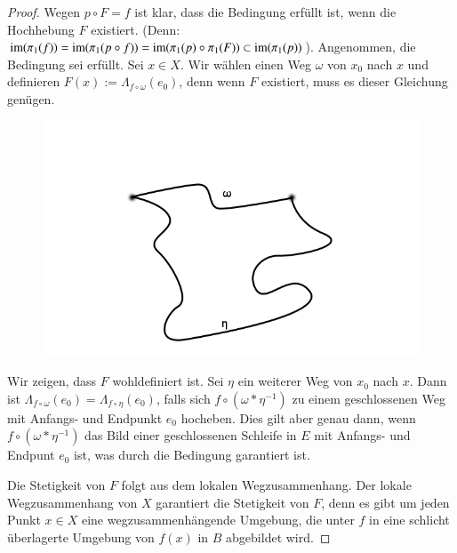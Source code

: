 \documentclass[a4paper,10pt]{scrartcl}
\begin{document}
\begin{proof}
 Wegen $p\circ F=f$ ist klar, dass die Bedingung erfüllt ist, wenn die Hochhebung $F$ existiert. (Denn: $\operatorname{im}(\pi_1(f))=\operatorname{im}(\pi_1(p\circ f))=\operatorname{im}(\pi_1(p)\circ \pi_1(F))\subset \operatorname{im}(\pi_1(p))$). Angenommen, die Bedingung sei erfüllt. Sei $x\in X$. Wir wählen einen Weg $\omega$ von $x_0$ nach $x$ und definieren $F(x):= \Lambda_{f\circ \omega}(e_0)$, denn wenn $F$ existiert, muss es dieser Gleichung genügen. 
\begin{figure}[H]
\centering
 \includegraphics[scale=0.3]{fig85.png}
 \caption{}
\end{figure}
Wir zeigen, dass $F$ wohldefiniert ist. Sei $\eta$ ein weiterer Weg von $x_0$ nach $x$. Dann ist $\Lambda_{f\circ \omega}(e_0)=\Lambda_{f\circ \eta} (e_0)$, falls sich $f\circ(\omega*\eta^{-1})$ zu einem geschlossenen Weg mit Anfangs- und Endpunkt $e_0$ hocheben. Dies gilt aber genau dann, wenn $f\circ(\omega*\eta^{-1})$ das Bild einer geschlossenen Schleife in $E$ mit Anfangs- und Endpunt $e_0$ ist, was durch die Bedingung garantiert ist.

Die Stetigkeit von $F$ folgt aus dem lokalen Wegzusammenhang. Der lokale Wegzusammenhang von $X$ garantiert die Stetigkeit von $F$, denn es gibt um jeden Punkt $x\in X$ eine wegzusammenhängende Umgebung, die unter $f$ in eine schlicht überlagerte Umgebung von $f(x)$ in $B$ abgebildet wird. 
\end{proof}
\end{document}
